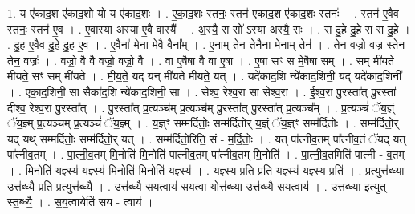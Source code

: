 \documentclass[17pt]{extarticle}
\begin{document}
1. य ए॑काद॒श ए॑काद॒शो यो य ए॑काद॒शः । . ए॒का॒द॒शः स्तनः॒ स्तन॑ एकाद॒श ए॑काद॒शः स्तनः॑ । . स्तन॑ ए॒वैव स्तनः॒ स्तन॑ ए॒व । . ए॒वास्या॑ अस्या ए॒वै वास्यै᳚ । . अ॒स्यै॒ स सो᳚ ऽस्या अस्यै॒ सः । . स दु॒हे दु॒हे स स दु॒हे । . दु॒ह ए॒वैव दु॒हे दु॒ह ए॒व । . ए॒वैना॑ मेना मे॒वै वैना᳚म् । . ए॒ना॒म् तेन॒ तेनै॑ना मेना॒म् तेन॑ । . तेन॒ वज्रो॒ वज्र॒ स्तेन॒ तेन॒ वज्रः॑ । . वज्रो॒ वै वै वज्रो॒ वज्रो॒ वै । . वा ए॒षैषा वै वा ए॒षा । . ए॒षा सꣳ स मे॒षैषा सम् । . सम् मी॑यते मीयते॒ सꣳ सम् मी॑यते । . मी॒य॒ते॒ यद् यन् मी॑यते मीयते॒ यत् । . यदे॑काद॒शि न्ये॑काद॒शिनी॒ यद् यदे॑काद॒शिनी᳚ । . ए॒का॒द॒शिनी॒ सा सैका॑द॒शि न्ये॑काद॒शिनी॒ सा । . सेश्व॒ रेश्व॒रा सा सेश्व॒रा । . ई॒श्व॒रा पु॒रस्ता᳚त् पु॒रस्ता॑ दीश्व॒ रेश्व॒रा पु॒रस्ता᳚त् । . पु॒रस्ता᳚त् प्र॒त्यञ्च॑म् प्र॒त्यञ्च॑म् पु॒रस्ता᳚त् पु॒रस्ता᳚त् प्र॒त्यञ्च᳚म् । . प्र॒त्यञ्चं॑ ॅय॒ज्ञ्ं ॅय॒ज्ञ्म् प्र॒त्यञ्च॑म् प्र॒त्यञ्चं॑ ॅय॒ज्ञ्म् । . य॒ज्ञ्ꣳ सम्म॑र्दितोः॒ सम्म॑र्दितोर् य॒ज्ञ्ं ॅय॒ज्ञ्ꣳ सम्म॑र्दितोः । . सम्म॑र्दितो॒र् यद् यथ् सम्म॑र्दितोः॒ सम्म॑र्दितो॒र् यत् । . सम्म॑र्दितो॒रिति॒ सं - म॒र्दि॒तोः॒ । . यत् पा᳚त्नीव॒तम् पा᳚त्नीव॒तं ॅयद् यत् पा᳚त्नीव॒तम् । . पा॒त्नी॒व॒तम् मि॒नोति॑ मि॒नोति॑ पात्नीव॒तम् पा᳚त्नीव॒तम् मि॒नोति॑ । . पा॒त्नी॒व॒तमिति॑ पात्नी - व॒तम् । . मि॒नोति॑ य॒ज्ञ्स्य॑ य॒ज्ञ्स्य॑ मि॒नोति॑ मि॒नोति॑ य॒ज्ञ्स्य॑ । . य॒ज्ञ्स्य॒ प्रति॒ प्रति॑ य॒ज्ञ्स्य॑ य॒ज्ञ्स्य॒ प्रति॑ । . प्रत्युत्त॑ब्ध्या॒ उत्त॑ब्ध्यै॒ प्रति॒ प्रत्युत्त॑ब्ध्यै । . उत्त॑ब्ध्यै सय॒त्वाय॑ सय॒त्वा योत्त॑ब्ध्या॒ उत्त॑ब्ध्यै सय॒त्वाय॑ । . उत्त॑ब्ध्या॒ इत्युत् - स्त॒ब्ध्यै॒ । . स॒य॒त्वायेति॑ सय - त्वाय॑ । \newline
\end{document}
